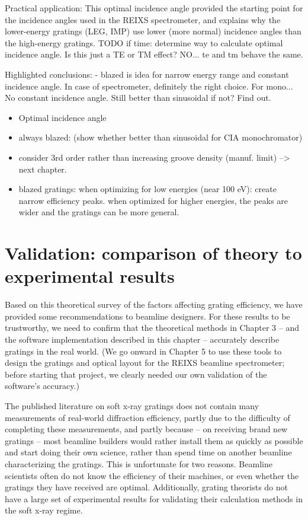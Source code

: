 	Practical application: This optimal incidence angle provided the starting point for the incidence angles used in the REIXS spectrometer, and explains why the lower-energy gratings (LEG, IMP) use lower (more normal) incidence angles than the high-energy gratings.
	TODO if time: determine way to calculate optimal incidence angle.  Is this just a TE or TM effect? NO... te and tm behave the same.
	
	
Highlighted conclusions:
	- blazed is idea for narrow energy range and constant incidence angle.  In case of spectrometer, definitely the right choice.  For mono... No constant incidence angle.  Still better than sinusoidal if not?  Find out.
	
\begin{itemize}
\item Optimal incidence angle
\item always blazed: (show whether better than sinusoidal for CIA monochromator)
\item consider 3rd order rather than increasing groove density (manuf. limit) --> next chapter.
\item blazed gratings: when optimizing for low energies (near 100 eV): create narrow efficiency peaks. when optimized for higher energies, the peaks are wider and the gratings can be more general.
\end{itemize}

\section{Validation: comparison of theory to experimental results}
Based on this theoretical survey of the factors affecting grating efficiency, we have provided some recommendations to beamline designers.  For these results to be trustworthy, we need to confirm that the theoretical methods in Chapter 3 -- and the software implementation described in this chapter -- accurately describe gratings in the real world.  (We go onward in Chapter 5 to use these tools to design the gratings and optical layout for the REIXS beamline spectrometer; before starting that project, we clearly needed our own validation of the software's accuracy.)

The published literature on soft x-ray gratings does not contain many measurements of real-world diffraction efficiency, partly due to the difficulty of completing these measurements, and partly because -- on receiving brand new gratings -- most beamline builders would rather install them as quickly as possible and start doing their own science, rather than spend time on another beamline characterizing the gratings.  This is unfortunate for two reasons.  Beamline scientists often do not know the efficiency of their machines, or even whether the gratings they have received are optimal. Additionally, grating theorists do not have a large set of experimental results for validating their calculation methods in the soft x-ray regime.

